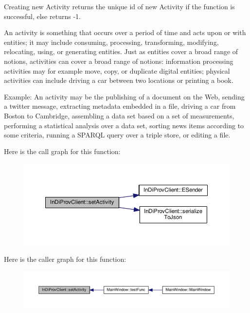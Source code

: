Creating new Activity returns the unique id of new Activity if the function is successful, else returns -\/1. 

An activity is something that occurs over a period of time and acts upon or with entities; it may include consuming, processing, transforming, modifying, relocating, using, or generating entities. Just as entities cover a broad range of notions, activities can cover a broad range of notions\-: information processing activities may for example move, copy, or duplicate digital entities; physical activities can include driving a car between two locations or printing a book.\par
 Example\-: An activity may be the publishing of a document on the Web, sending a twitter message, extracting metadata embedded in a file, driving a car from Boston to Cambridge, assembling a data set based on a set of measurements, performing a statistical analysis over a data set, sorting news items according to some criteria, running a S\-P\-A\-R\-Q\-L query over a triple store, or editing a file. 

Here is the call graph for this function\-:
\nopagebreak
\begin{figure}[H]
\begin{center}
\leavevmode
\includegraphics[width=350pt]{class_in_di_prov_client_a8a2e2aaf3f8b6a8e31f31af31603b681_cgraph}
\end{center}
\end{figure}




Here is the caller graph for this function\-:
\nopagebreak
\begin{figure}[H]
\begin{center}
\leavevmode
\includegraphics[width=350pt]{class_in_di_prov_client_a8a2e2aaf3f8b6a8e31f31af31603b681_icgraph}
\end{center}
\end{figure}


